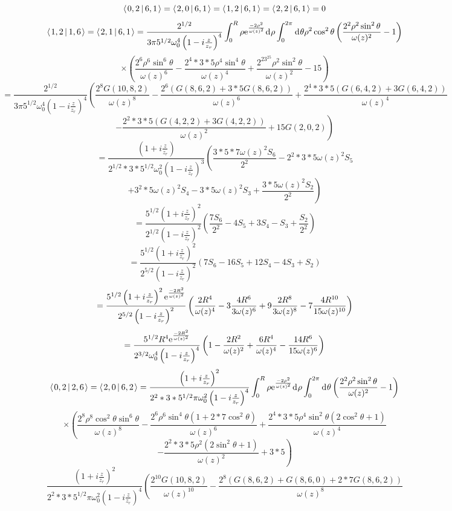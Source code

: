 \documentclass[11pt]{amsart}
\makeatletter
\newcommand{\e}{{\rm e}}				%
\newcommand{\msp}[1]{\mspace{#1mu}}		%
\newcommand{\0}{\varnothing}		%
\newcommand{\dd}{\msp{1} {\rm{d}} \msp{1}}	%
\newcommand{\brac}[2]{\left\langle\msp{2} #1\left\lvert \msp{3.5} #2 \right.\right\rangle}	%
\newcommand{\1}{!}
\newcommand{\2}{@}
\newcommand{\3}{\#}
\newcommand{\4}{\$}
\newcommand{\5}{\%}
\newcommand{\6}{$^\wedge$}
\newcommand{\7}{\&}
\newcommand{\8}{*}
\newcommand{\9}{(}
\makeatother
\begin{document}
\[
\brac{0,2}{6,1} = \brac{2,0}{6,1} = \brac{1,2}{6,1} = \brac{2,2}{6,1} = 0
\]
\[
\brac{1,2}{1,6} = \brac{2,1}{6,1} = \frac{2^{1/2}}{3\pi5^{1/2}\omega_0^4\left(1-i\frac{z}{z_r}\right)^4}\int_0^R \rho \e^{\frac{-2\rho^2}{\omega(z)^2}}\dd \rho \int_0^{2\pi}\dd \theta\rho^2 \cos^2 \theta\left(\frac{2^2\rho^2\sin^2\theta}{\omega(z)^2}-1\right)
\]
\[
\times\left(\frac{2^6\rho^6\sin^6\theta}{\omega(z)^6}-\frac{2^4*3*5\rho^4\sin^4\theta}{\omega(z)^4}+\frac{2^23^25\rho^2\sin^2\theta}{\omega(z)^2}-15\right)
\]
\[
= \frac{2^{1/2}}{3\pi5^{1/2}\omega_0^4\left(1-i\frac{z}{z_r}\right)^4}\left(\frac{2^8G(10,8,2)}{\omega(z)^8}-\frac{2^6\left(G(8,6,2)+3*5G(8,6,2)\right)}{\omega(z)^6}+\frac{2^4*3*5\left(G(6,4,2)+3G(6,4,2)\right)}{\omega(z)^4}\right.
\]
\[
\left.-\frac{2^2*3*5\left(G(4,2,2)+3G(4,2,2)\right)}{\omega(z)^2}+15G(2,0,2)\right)
\]
\[
= \frac{\left(1+i\frac{z}{z_r}\right)}{2^{1/2}*3*5^{1/2}\omega_0^2\left(1-i\frac{z}{z_r}\right)^3}\left(\frac{3*5*7\omega(z)^2S_6}{2^2}-2^2*3*5\omega(z)^2S_5\right.
\]
\[
\left.+3^2*5\omega(z)^2S_4-3*5\omega(z)^2S_3+\frac{3*5\omega(z)^2S_2}{2^2}\right)
\]
\[
=\frac{5^{1/2}\left(1+i\frac{z}{z_r}\right)^2}{2^{1/2}\left(1-i\frac{z}{z_r}\right)^2}\left(\frac{7S_6}{2^2}-4S_5+3S_4-S_3+\frac{S_2}{2^2}\right)
\]
\[
=\frac{5^{1/2}\left(1+i\frac{z}{z_r}\right)^2}{2^{5/2}\left(1-i\frac{z}{z_r}\right)^2}\left(7S_6-16S_5+12S_4-4S_3+S_2\right)
\]
\[
=\frac{5^{1/2}\left(1+i\frac{z}{z_r}\right)^2\e^{\frac{-2R^2}{\omega(z)^2}}}{2^{5/2}\left(1-i\frac{z}{z_r}\right)^2}\left(\frac{2R^4}{\omega(z)^4}-3\frac{4R^6}{3\omega(z)^6}+9\frac{2R^8}{3\omega(z)^8}-7\frac{4R^{10}}{15\omega(z)^{10}}\right)
\]
\[
=\frac{5^{1/2}R^4\e^{\frac{-2R^2}{\omega(z)^2}}}{2^{3/2}\omega_0^4\left(1-i\frac{z}{z_r}\right)^4}\left(1-\frac{2R^2}{\omega(z)^2}+\frac{6R^4}{\omega(z)^4}-\frac{14R^6}{15\omega(z)^6}\right)
\]
\[
\brac{0,2}{2,6} = \brac{2,0}{6,2} = \frac{\left(1+i\frac{z}{z_r}\right)^2}{2^2*3*5^{1/2}\pi\omega_0^2\left(1-i\frac{z}{z_r}\right)^4}\int_0^R\rho \e^{\frac{-2\rho^2}{\omega(z)^2}}\dd \rho \int_0^{2\pi}\dd \theta\left(\frac{2^2\rho^2\sin^2\theta}{\omega(z)^2}-1\right)
\]
\[
\times\left(\frac{2^8\rho^8\cos^2\theta\sin^6\theta}{\omega(z)^8}-\frac{2^6\rho^6\sin^4\theta\left(1+2*7\cos^2\theta\right)}{\omega(z)^6}+\frac{2^4*3*5\rho^4\sin^2\theta\left(2\cos^2\theta+1\right)}{\omega(z)^4}\right.
\]
\[
\left.-\frac{2^2*3*5\rho^2\left(2\sin^2\theta+1\right)}{\omega(z)^2}+3*5\right)
\]
\[
\frac{\left(1+i\frac{z}{z_r}\right)^2}{2^2*3*5^{1/2}\pi \omega_0^2\left(1-i\frac{z}{z_r}\right)^4}\left(\frac{2^{10}G(10,8,2)}{\omega(z)^{10}}-\frac{2^8\left(G(8,6,2)+G(8,6,0)+2*7G(8,6,2)\right)}{\omega(z)^8}\right.
\]
\end{document}
